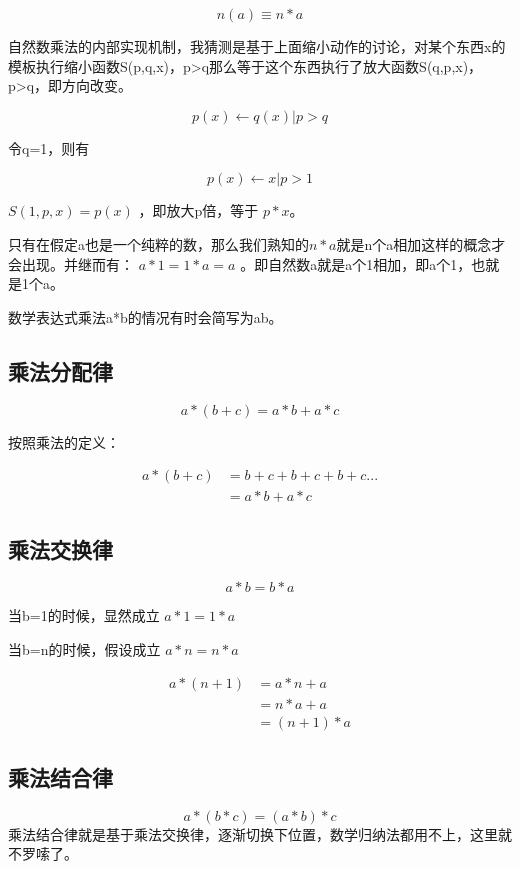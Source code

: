 \documentclass[12pt,oneside]{book}
\begin{document}
\[
n(a) \equiv n*a
\]

自然数乘法的内部实现机制，我猜测是基于上面缩小动作的讨论，对某个东西x的模板执行缩小函数S(p,q,x)，p>q那么等于这个东西执行了放大函数S(q,p,x)，p>q，即方向改变。

\[
p(x) \leftarrow q(x)   | p>q
\]

令q=1，则有

\[
p(x) \leftarrow x   | p>1
\]

$S(1, p, x) =p(x) $ ，即放大p倍，等于 $p*x$。

只有在假定a也是一个纯粹的数，那么我们熟知的$n*a$就是n个a相加这样的概念才会出现。并继而有： $a * 1 = 1*a = a$ 。即自然数a就是a个1相加，即a个1，也就是1个a。

数学表达式乘法a*b的情况有时会简写为ab。



\subsection{乘法分配律}
\begin{equation}
a*(b + c) = a*b + a*c
\end{equation}

按照乘法的定义：

\begin{align*}
a*(b+c) &= b+c + b+ c + b +c ...\\
&=a*b + a*c
\end{align*}



\subsection{乘法交换律}
\begin{equation}
a * b = b * a
\end{equation}

当b=1的时候，显然成立 $a*1 = 1*a$

当b=n的时候，假设成立 $a*n=n*a$

\begin{align*}
a*(n+1) &= a*n +a \\
&=n*a +a\\
&=(n+1)*a
\end{align*}


\subsection{乘法结合律}
\begin{equation}
a * (b * c) = (a * b) * c
\end{equation}
乘法结合律就是基于乘法交换律，逐渐切换下位置，数学归纳法都用不上，这里就不罗嗦了。
\end{document}
